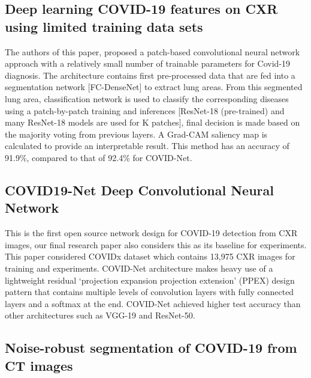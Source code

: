 \documentclass{sigkddExp}
\begin{document}
\subsection{Deep learning COVID-19 features on CXR using limited training data sets}

The authors of this paper\cite{pmid32396075}, proposed a patch-based
convolutional neural network approach with a relatively small number of
trainable parameters for Covid-19 diagnosis. The architecture contains first
pre-processed data that are fed into a segmentation network [FC-DenseNet] to
extract lung areas. From this segmented lung area, classification network is
used to classify the corresponding diseases using a patch-by-patch training and
inferences [ResNet-18 (pre-trained) and many ResNet-18 models are used for K
patches], final decision is made based on the majority voting from previous
layers. A Grad-CAM saliency map is calculated to provide an interpretable
result. This method has an accuracy of 91.9\%, compared to that of 92.4\% for
COVID-Net.

\subsection{COVID19-Net Deep Convolutional Neural Network}

This is the first open source network design for COVID-19 detection from CXR images,
our final research paper also considers this as its baseline for experiments.
This paper considered COVIDx dataset which contains 13,975 CXR images for training and
experiments. COVID-Net architecture makes heavy use of a lightweight residual
‘projection expansion projection extension’ (PPEX) design pattern that contains multiple
levels of convolution layers with fully connected layers and a softmax at the end.
COVID-Net achieved higher test accuracy than other architectures such as VGG-19 and ResNet-50.

\subsection{Noise-robust segmentation of COVID-19 from CT images}
\end{document}
